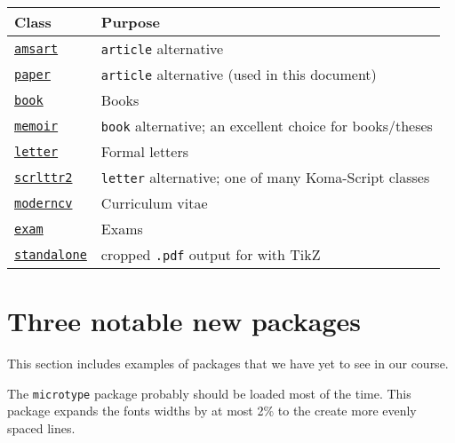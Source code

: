 \documentclass{paper}
\begin{document}
\begin{center}
\begin{tabular}{l l}
\toprule 

Class & Purpose \\

\midrule

\href{https://www.ctan.org/pkg/amsart}{\texttt{amsart}}  
& \texttt{article} alternative \\

\href{https://www.ctan.org/tex-archive/macros/latex/contrib/paper}{\texttt{paper}}  
& \texttt{article} alternative (used in this document) \\

\href{https://www.ctan.org/pkg/book}{\texttt{book}}  
& Books \\

\href{https://www.ctan.org/pkg/memoir}{\texttt{memoir}}  
& \texttt{book} alternative; an excellent choice for books/theses \\

\href{https://www.ctan.org/pkg/letter}{\texttt{letter}}  
& Formal letters \\

\href{https://www.ctan.org/pkg/scrlttr2}{\texttt{scrlttr2}}  
& \texttt{letter} alternative; one of many Koma-Script classes  \\

\href{https://www.ctan.org/pkg/moderncv}{\texttt{moderncv}} 
& Curriculum vitae \\

\href{https://www.ctan.org/tex-archive/macros/latex/contrib/exam}{\texttt{exam}}  
& Exams \\

\href{https://www.ctan.org/pkg/standalone}{\texttt{standalone}} 
& cropped \texttt{.pdf} output for with TikZ \\
\bottomrule
\end{tabular}
\end{center}

\section{Three notable new packages}

This section includes examples of packages that we have yet to see in our course.

The \verb~microtype~ package probably should be loaded most of the time.  This package expands the
fonts widths by at most 2\% to the create more evenly spaced lines. 
\end{document}
